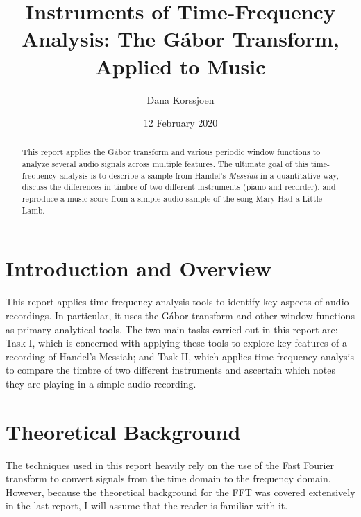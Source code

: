 \documentclass[a4paper,10 pt]{article}
\title{Instruments of Time-Frequency Analysis: The G\'abor Transform, Applied to Music}
\author{Dana Korssjoen}
\date{12 February 2020}
\begin{document}
\maketitle
\begin{abstract}
    This report applies the G\'abor transform and various periodic window functions to analyze several audio signals across multiple features. The ultimate goal of this time-frequency analysis is to describe a sample from Handel's \emph{Messiah} in a quantitative way, discuss the differences in timbre of two different instruments (piano and recorder), and reproduce a music score from a simple audio sample of the song Mary Had a Little Lamb.
\end{abstract}
\section{Introduction and Overview}

This report applies time-frequency analysis tools to identify key aspects of audio recordings. In particular, it uses the G\'abor transform and other window functions as primary analytical tools. The two main tasks carried out in this report are: Task I, which is concerned with applying these tools to explore key features of a recording of Handel's Messiah; and Task II, which applies time-frequency analysis to compare the timbre of two different instruments and ascertain which notes they are playing in a simple audio recording.

\section{Theoretical Background}
The techniques used in this report heavily rely on the use of the Fast Fourier transform to convert signals from the time domain to the frequency domain. However, because the theoretical background for the FFT was covered extensively in the last report, I will assume that the reader is familiar with it.
\end{document}
